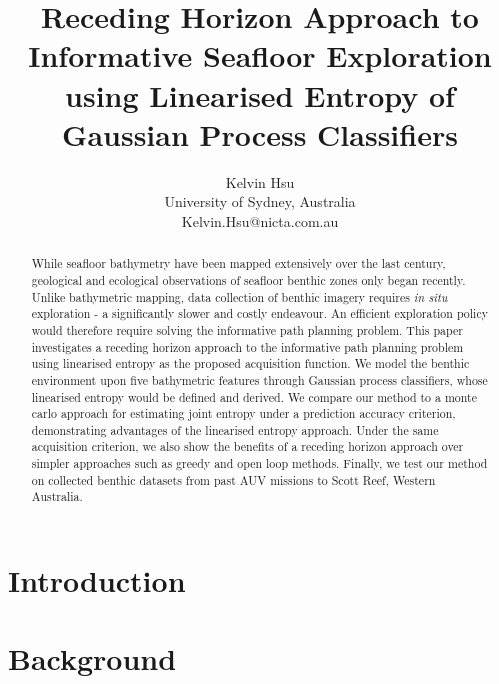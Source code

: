 \documentclass{article}
\title{Receding Horizon Approach to Informative Seafloor Exploration using Linearised Entropy of Gaussian Process Classifiers}
\author{Kelvin Hsu \\ University of Sydney, Australia \\ 
Kelvin.Hsu@nicta.com.au}
\begin{document}
\maketitle

\begin{abstract}
	While seafloor bathymetry have been mapped extensively over the last century, geological and ecological observations of seafloor benthic zones only began recently. Unlike bathymetric mapping, data collection of benthic imagery requires \textit{in situ} exploration - a significantly slower and costly endeavour. An efficient exploration policy would therefore require solving the informative path planning problem. This paper investigates a receding horizon approach to the informative path planning problem using linearised entropy as the proposed acquisition function. We model the benthic environment upon five bathymetric features through Gaussian process classifiers, whose linearised entropy would be defined and derived. We compare our method to a monte carlo approach for estimating joint entropy under a prediction accuracy criterion, demonstrating advantages of the linearised entropy approach. Under the same acquisition criterion, we also show the benefits of a receding horizon approach over simpler approaches such as greedy and open loop methods. Finally, we test our method on collected benthic datasets from past AUV missions to Scott Reef, Western Australia. 
\end{abstract}

\section{Introduction}
\label{Section:Introduction}
	
\section{Background}
\label{Section:Background}

%	
%	
	
\end{document}
